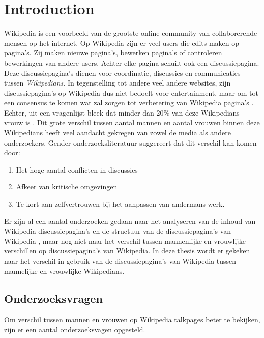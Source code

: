 \section{Introduction}
\label{sec:intro}

Wikipedia is een voorbeeld van de grootste online community van collaborerende mensen op het internet. Op Wikipedia zijn er veel users die edits maken op pagina's. Zij maken nieuwe pagina's, bewerken pagina's of controleren bewerkingen van andere users. Achter elke pagina schuilt ook een discussiepagina. Deze discussiepagina's dienen voor coordinatie, discussies en communicaties tussen \textit{Wikipedians}. In tegenstelling tot andere veel andere websites, zijn discussiepagina's op Wikipedia dus niet bedoelt voor entertainment, maar om tot een consensus te komen wat zal zorgen tot verbetering van Wikipedia pagina's \citep{laniado2011wikipedians}.  Echter, uit een vragenlijst bleek dat minder dan 20\% van deze Wikipedians vrouw is \citep{glott2010analysis}. Dit grote verschil tussen aantal mannen en aantal vrouwen binnen deze Wikipedians heeft veel aandacht gekregen van zowel de media als andere onderzoekers. Gender onderzoeksliteratuur \citep{collier2012conflict} suggereert dat dit verschil kan komen door:
\begin{enumerate}
    \item Het hoge aantal conflicten in discussies
    \item Afkeer van kritische omgevingen
    \item Te kort aan zelfvertrouwen bij het aanpassen van andermans werk.
\end{enumerate}  
Er zijn al een aantal onderzoeken gedaan naar het analyseren van de inhoud van Wikipedia discussiepagina's \citep{viegas2007talk} en de structuur van de discussiepagina's van Wikipedia \citep{laniado2011wikipedians}, maar nog niet naar het verschil tussen mannenlijke en vrouwlijke verschillen op discussiepagina's van Wikipedia. In deze thesis wordt er gekeken naar het verschil in gebruik van de discussiepagina's van Wikipedia tussen mannelijke en vrouwlijke Wikipedians.



\subsection{Onderzoeksvragen}
Om verschil tussen mannen en vrouwen op Wikipedia talkpages beter te bekijken, zijn er een aantal onderzoeksvagen opgesteld. 

